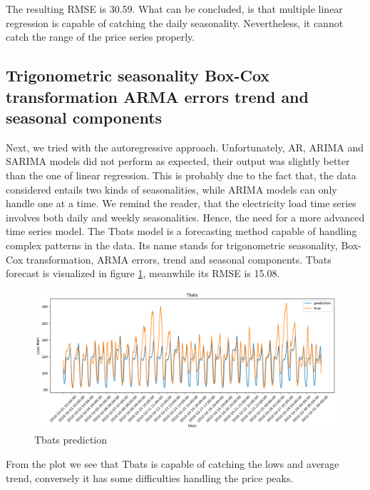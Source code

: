 The resulting RMSE is 30.59.
What can be concluded, is that multiple linear regression is capable of catching the daily seasonality. Nevertheless, it cannot catch the range of the price series properly.

\subsection{Trigonometric seasonality Box-Cox transformation ARMA errors trend and seasonal components}
Next, we tried with the autoregressive approach. Unfortunately, AR, ARIMA and SARIMA models did not perform as expected, their output was slightly better than the one of linear regression. This is probably due to the fact that, the data considered entails two kinds of seasonalities, while ARIMA models can only handle one at a time. We remind the reader, that the electricity load time series involves both daily and weekly seasonalities. Hence, the need for a more advanced time series model. The Tbats \cite{de2011forecasting} model is a forecasting method capable of handling complex patterns in the data. Its name stands for trigonometric seasonality, Box-Cox transformation, ARMA errors, trend and seasonal components. 
Tbats forecast is visualized in figure \ref{fig:tbats_price}, meanwhile its RMSE is 15.08.
\begin{figure}[!h]
    \includegraphics[width=\textwidth]{images/tbats_price.png}
    \caption{Tbats prediction}
    \label{fig:tbats_price}
\end{figure}
From the plot we see that Tbats is capable of catching the lows and average trend, conversely it has some difficulties handling the price peaks.

